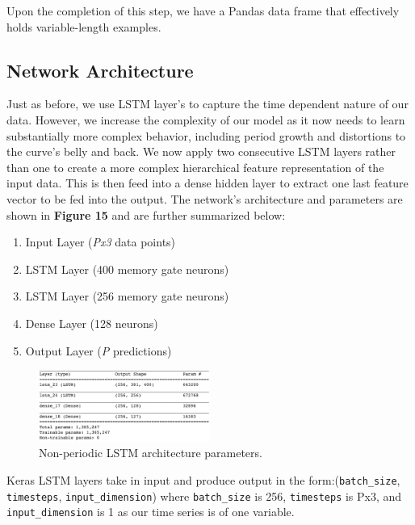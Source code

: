 \documentclass[letterpaper, 10 pt, conference]{ieeeconf}  %
\begin{document}
Upon the completion of this step, we have a Pandas data frame that effectively holds variable-length examples.

\subsection{Network Architecture}

Just as before, we use LSTM layer's to capture the time dependent nature of our data. However, we increase the complexity of our model as it now needs to learn substantially more complex behavior, including period growth and distortions to the curve's belly and back. We now apply two consecutive LSTM layers rather than one to create a more complex hierarchical feature representation of the input data. This is then feed into a dense hidden layer to extract one last feature vector to be fed into the output. The network's architecture and parameters are shown in \textbf{Figure 15} and are further summarized below:

\begin{enumerate}
\item Input Layer (\textit{Px3} data points)
\item LSTM Layer  (400 memory gate neurons)
\item LSTM Layer  (256 memory gate neurons)
\item Dense Layer (128 neurons)
\item Output Layer (\textit{P} predictions)
\end{enumerate}

\label{NonperiodicParams}
\begin{figure}[!h]
	\centering
	\includegraphics[width=0.5\textwidth]{assets/non_periodic_params.png}
    \caption{Non-periodic LSTM architecture parameters.}
\end{figure}

Keras LSTM layers take in input and produce output in the form:(\texttt{batch\_size}, \texttt{timesteps}, \texttt{input\_dimension}) where \texttt{batch\_size} is 256, \texttt{timesteps} is Px3, and \texttt{input\_dimension} is 1 as our time series is of one variable.
\end{document}
